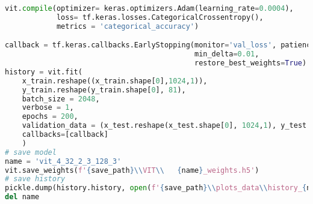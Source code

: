 \begin{lstlisting}[language=Python]
vit.compile(optimizer= keras.optimizers.Adam(learning_rate=0.0004),
            loss= tf.keras.losses.CategoricalCrossentropy(),
            metrics = 'categorical_accuracy')

callback = tf.keras.callbacks.EarlyStopping(monitor='val_loss', patience=7,
                                            min_delta=0.01,
                                            restore_best_weights=True)
history = vit.fit(
    x_train.reshape((x_train.shape[0],1024,1)),
    y_train.reshape(y_train.shape[0], 81),
    batch_size = 2048,
    verbose = 1,
    epochs = 200,
    validation_data = (x_test.reshape(x_test.shape[0], 1024,1), y_test.reshape(y_test.shape[0],n_elements)),
    callbacks=[callback]
    )
# save model
name = 'vit_4_32_2_3_128_3'
vit.save_weights(f'{save_path}\\VIT\\   {name}_weights.h5')
# save history
pickle.dump(history.history, open(f'{save_path}\\plots_data\\history_{name}.pkl', 'wb'))
del name
\end{lstlisting}

